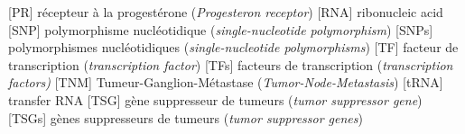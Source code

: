 \begin{acronym}[CDKN2A]
			    {récepteur à la progestérone (\emph{Progesteron receptor})}
			   {ribonucleic acid}
			   {polymorphisme nucléotidique (\emph{single-nucleotide polymorphism})}
			  {polymorphismes nucléotidiques (\emph{single-nucleotide polymorphisms})}
			    {facteur de transcription (\emph{transcription factor})}
			   {facteurs de transcription (\emph{transcription factors)}}
			   {Tumeur-Ganglion-Métastase (\emph{Tumor-Node-Metastasis})}
			  {transfer \ac{RNA}}
			   {gène suppresseur de tumeurs (\emph{tumor suppressor gene})}
			  {gènes suppresseurs de tumeurs (\emph{tumor suppressor genes})}
		\end{acronym}

